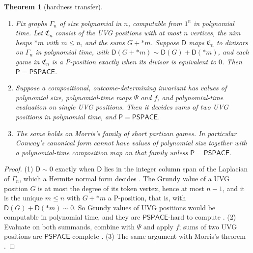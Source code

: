 \documentclass[11pt]{amsart}
\theoremstyle{plain}
\newtheorem{theorem}{Theorem}[section]
\theoremstyle{definition}
\theoremstyle{remark}
\numberwithin{equation}{section}
\newcommand{\Dv}{\mathsf{D}}              %
\newcommand{\cls}[1]{\mathsf{#1}}
\newcommand{\PSPACE}{\cls{PSPACE}}
\newcommand{\Pclass}{\cls{P}}
\begin{document}
\begin{theorem}[hardness transfer]\label{thm:hardness}
\begin{enumerate}[label=\textup{(\arabic*)}]
\item Fix graphs $\Gamma_n$ of size polynomial in $n$, computable from $1^n$ in polynomial time. Let $\mathfrak C_n$ consist of the UVG positions with at most $n$ vertices, the nim heaps $*m$ with $m\le n$, and the sums $G+*m$. Suppose $\Dv$ maps $\mathfrak C_n$ to divisors on $\Gamma_n$ in polynomial time, with $\Dv(G+*m)\sim\Dv(G)+\Dv(*m)$, and each game in $\mathfrak C_n$ is a P-position exactly when its divisor is equivalent to $0$. Then $\Pclass=\PSPACE$.
\item Suppose a compositional, outcome-determining invariant has values of polynomial size, polynomial-time maps $\Psi$ and $f$, and polynomial-time evaluation on single UVG positions. Then it decides sums of two UVG positions in polynomial time, and $\Pclass=\PSPACE$.
\item The same holds on Morris's family of short partizan games. In particular Conway's canonical form cannot have values of polynomial size together with a polynomial-time composition map on that family unless $\Pclass=\PSPACE$.
\end{enumerate}
\end{theorem}
\begin{proof}
(1) $\Dv\sim0$ exactly when $\Dv$ lies in the integer column span of the Laplacian of $\Gamma_n$, which a Hermite normal form decides \cite{KannanBachem}. The Grundy value of a UVG position $G$ is at most the degree of its token vertex, hence at most $n-1$, and it is the unique $m\le n$ with $G+*m$ a P-position, that is, with $\Dv(G)+\Dv(*m)\sim0$. So Grundy values of UVG positions would be computable in polynomial time, and they are $\PSPACE$-hard to compute \cite{BFT}. (2) Evaluate on both summands, combine with $\Psi$ and apply $f$; sums of two UVG positions are $\PSPACE$-complete \cite{BFT}. (3) The same argument with Morris's theorem \cite{Morris}.
\end{proof}
\end{document}
